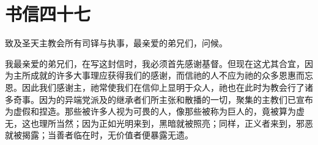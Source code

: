 

\section{书信四十七}

\par

致及圣天主教会所有司铎与执事，最亲爱的弟兄们，问候。\par

我最亲爱的弟兄们，在写这封信时，我必须首先感谢基督。但现在这尤其合宜，因为主所成就的许多大事理应获得我们的感谢，而信祂的人不应为祂的众多恩惠而忘恩。因此我们感谢主，祂常使我们在信仰上显明于众人，祂也在此时为教会行了诸多奇事。因为的异端党派及的继承者们所主张和散播的一切，聚集的主教们已宣布为虚假和捏造。那些被许多人视为可畏的人，像那些被称为巨人的，竟被算为虚无，这也理所当然；因为正如光明来到，黑暗就被照亮；同样，正义者来到，邪恶就被揭露；当善者临在时，无价值者便暴露无遗。\par

